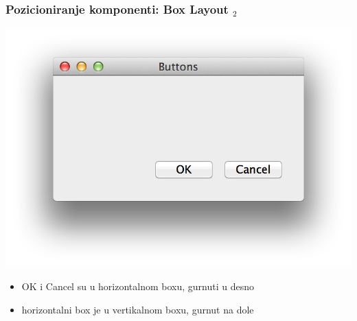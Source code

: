 \documentclass[utf8,compress]{beamer}
\begin{document}
\begin{frame}[fragile]
  \frametitle{Pozicioniranje komponenti: Box Layout $_2$}
\begin{center}
\includegraphics[scale=0.4]{pyqt06.png}
\end{center}
  \begin{itemize}
    \item OK i Cancel su u horizontalnom boxu, gurnuti u desno
    \item horizontalni box je u vertikalnom boxu, gurnut na dole
  \end{itemize}
\end{frame}
\end{document}
